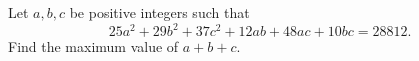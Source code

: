 Let $a,b,c$ be positive integers such that
\[
25a^2+29b^2+37c^2+12ab+48ac+10bc=28812 .
\]
Find the maximum value of $a+b+c$.
